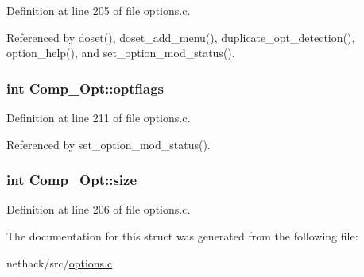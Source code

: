 Definition at line 205 of file options.\+c.



Referenced by doset(), doset\+\_\+add\+\_\+menu(), duplicate\+\_\+opt\+\_\+detection(), option\+\_\+help(), and set\+\_\+option\+\_\+mod\+\_\+status().

\hypertarget{structComp__Opt_a37f680c03f08f1190c7cf67ad8e1232c}{
\subsubsection[{optflags}]{\setlength{\rightskip}{0pt plus 5cm}int Comp\+\_\+\+Opt\+::optflags}}\label{structComp__Opt_a37f680c03f08f1190c7cf67ad8e1232c}


Definition at line 211 of file options.\+c.



Referenced by set\+\_\+option\+\_\+mod\+\_\+status().

\hypertarget{structComp__Opt_af56359b81acbde92474bb8d1bb290acd}{
\subsubsection[{size}]{\setlength{\rightskip}{0pt plus 5cm}int Comp\+\_\+\+Opt\+::size}}\label{structComp__Opt_af56359b81acbde92474bb8d1bb290acd}


Definition at line 206 of file options.\+c.



The documentation for this struct was generated from the following file\+:\begin{DoxyCompactItemize}
\item 
nethack/src/\hyperlink{options_8c}{options.\+c}\end{DoxyCompactItemize}

